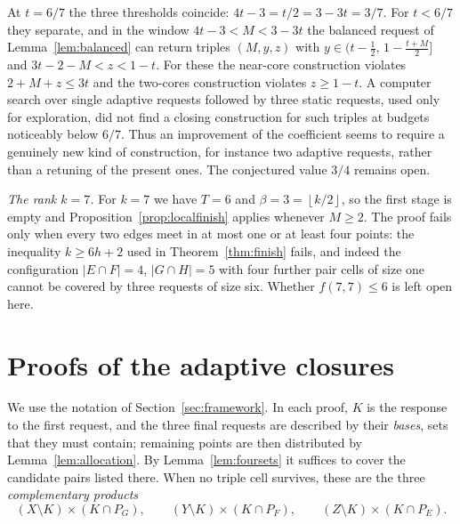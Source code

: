 \documentclass[11pt]{article}
\numberwithin{equation}{section}
\theoremstyle{definition}
\theoremstyle{remark}
\newcommand{\floor}[1]{\left\lfloor #1\right\rfloor}
\begin{document}
At $t=6/7$ the three thresholds coincide: $4t-3=t/2=3-3t=3/7$. For
$t<6/7$ they separate, and in the window $4t-3<M<3-3t$ the balanced
request of Lemma~\ref{lem:balanced} can return triples
$(M,y,z)$ with $y\in(t-\tfrac12,\,1-\tfrac{t+M}2]$ and
$3t-2-M<z<1-t$. For these the near-core construction violates
$2+M+z\le3t$ and the two-cores construction violates $z\ge1-t$. A
computer search
over single adaptive requests followed by three static requests, used
only for exploration, did not find a closing construction for such
triples at budgets noticeably below $6/7$. Thus an improvement of the
coefficient seems to require a genuinely new kind of construction, for
instance two adaptive requests, rather than a retuning of the present
ones. The conjectured value $3/4$ remains open.

\emph{The rank $k=7$.} For $k=7$ we have $T=6$ and
$\beta=3=\floor{k/2}$, so the first stage is empty and
Proposition~\ref{prop:localfinish} applies whenever $M\ge2$. The proof
fails only when every two edges meet in at most one or at least four
points: the inequality $k\ge6h+2$ used in Theorem~\ref{thm:finish}
fails, and indeed the configuration $|E\cap F|=4$, $|G\cap H|=5$ with
four further pair cells of size one cannot be covered by three
requests of size six. Whether $f(7,7)\le6$ is left open here.

\appendix
\section{Proofs of the adaptive closures}\label{app:adaptive}

We use the notation of Section~\ref{sec:framework}. In each proof, $K$
is the response to the first request, and the three final requests are
described by their \emph{bases}, sets that they must contain; remaining
points are then distributed by Lemma~\ref{lem:allocation}. By
Lemma~\ref{lem:foursets} it suffices to cover the candidate pairs listed
there. When no triple cell survives, these are the three
\emph{complementary products}
\[
 (X\setminus K)\times(K\cap P_G),\qquad
 (Y\setminus K)\times(K\cap P_F),\qquad
 (Z\setminus K)\times(K\cap P_E).
\]
\end{document}
